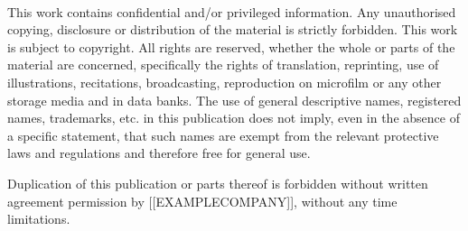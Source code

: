 ~

\vspace{15.0mm}




This work contains confidential and/or privileged information. Any
unauthorised copying, disclosure or distribution of the material is
strictly forbidden. This work is subject to copyright. All rights
are reserved, whether the whole or parts of the material are concerned,
specifically the rights of translation, reprinting, use of illustrations,
recitations, broadcasting, reproduction on microfilm or any other
storage media and in data banks. The use of general descriptive names,
registered names, trademarks, etc. in this publication does not imply,
even in the absence of a specific statement, that such names are exempt
from the relevant protective laws and regulations and therefore free
for general use. 

Duplication of this publication or parts thereof is forbidden without
written agreement permission by {[}{[}EXAMPLECOMPANY{]}{]}, without any
time limitations.
